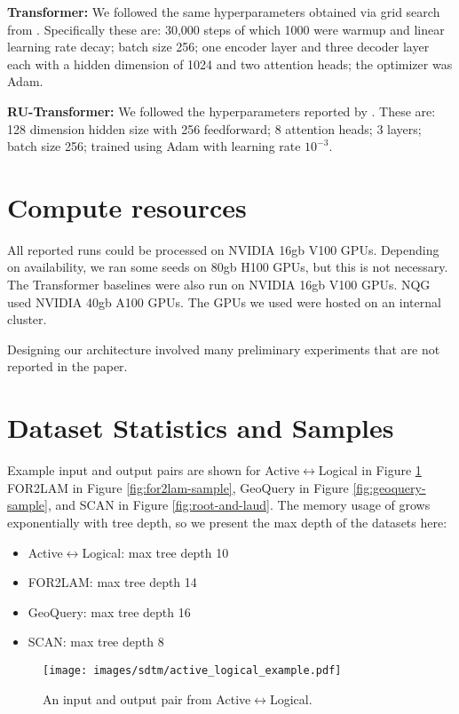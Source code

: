 \textbf{Transformer:} We followed the same hyperparameters obtained via grid search from \cite{pmlr-v202-soulos23a}. Specifically these are: 30,000 steps of which 1000 were warmup and linear learning rate decay; batch size 256; one encoder layer and three decoder layer each with a hidden dimension of 1024 and two attention heads; the optimizer was Adam. 

\textbf{RU-Transformer:} We followed the hyperparameters reported by \cite{csordas-etal-2021-devil}. These are: 128 dimension hidden size with 256 feedforward; 8 attention heads; 3 layers; batch size 256; trained using Adam with learning rate $10^{-3}$. 

\section{Compute resources} \label{sec:sdtm-compute-resources}
All reported \sdtm runs could be processed on NVIDIA 16gb V100 GPUs. Depending on availability, we ran some seeds on 80gb H100 GPUs, but this is not necessary. The Transformer baselines were also run on NVIDIA 16gb V100 GPUs. NQG used NVIDIA 40gb A100 GPUs. The GPUs we used were hosted on an internal cluster. 

Designing our architecture involved many preliminary experiments that are not reported in the paper.

\section{Dataset Statistics and Samples} \label{sec:sdtm-data-stats-samples}
Example input and output pairs are shown for Active$\leftrightarrow$Logical in Figure \ref{fig:active-logical-sample}  FOR2LAM in Figure \ref{fig:for2lam-sample}, GeoQuery in Figure \ref{fig:geoquery-sample}, and SCAN in Figure \ref{fig:root-and-laud}. The memory usage of \dtm grows exponentially with tree depth, so we present the max depth of the datasets here:
\begin{itemize}
    \item Active$\leftrightarrow$Logical: max tree depth 10
    \item FOR2LAM: max tree depth 14
    \item GeoQuery: max tree depth 16
    \item SCAN: max tree depth 8
\end{itemize}


\begin{figure}
    \centering
    \texttt{[image: images/sdtm/active\_logical\_example.pdf]}
    \caption{An input and output pair from Active$\leftrightarrow$Logical. }
    \label{fig:active-logical-sample}
\end{figure}


